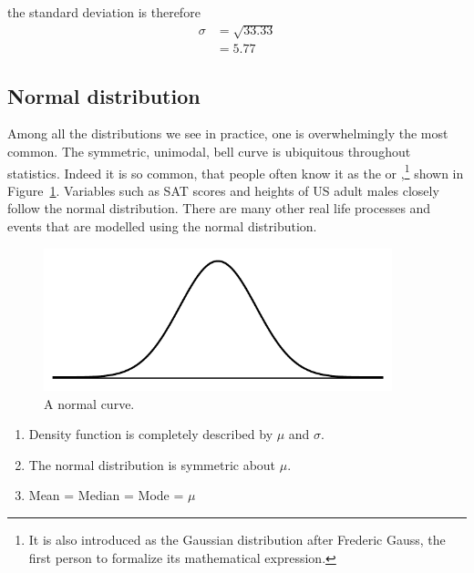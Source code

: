 the standard deviation is therefore
\begin{align*}
\sigma	& =	\sqrt{33.33}	\\
		& =	5.77			
\end{align*}




\subsection{Normal distribution}
\label{normalDist}


Among all the distributions we see in practice, one is overwhelmingly the most common. The symmetric, unimodal, bell curve is ubiquitous throughout statistics. Indeed it is so common, that people often know it as the  or ,\footnote{It is also introduced as the Gaussian distribution after Frederic Gauss, the first person to formalize its mathematical expression.} shown in Figure~\ref{simpleNormal}. Variables such as SAT scores and heights of US adult males closely follow the normal distribution.
There are many other real life processes and events that are modelled using the normal distribution.

\begin{figure}[H]
\centering
\includegraphics[width=0.9\textwidth]{03/figures/simpleNormal/simpleNormal}
\caption{A normal curve.}
\label{simpleNormal}
\end{figure}


\begin{termBox}{
\vspace{-5mm}
\begin{enumerate}
\item	Density function is completely described by $\mu$ and $\sigma$.
\item	The normal distribution is symmetric about $\mu$.
\item	Mean = Median = Mode = $\mu$
\end{enumerate}%
\vspace{-2.0mm}
}
\end{termBox}

